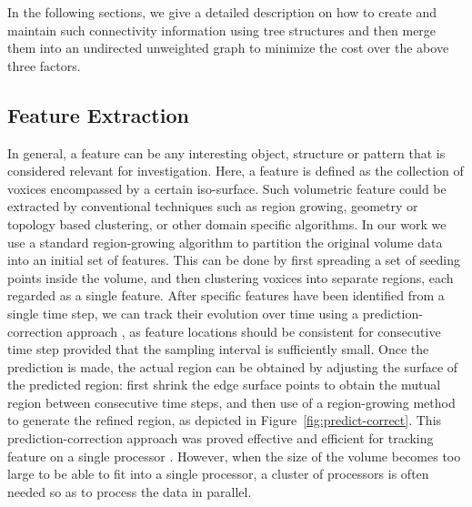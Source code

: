 \documentclass[10pt, conference, compsocconf]{IEEEtran}
\begin{document}
In the following sections, we give a detailed description on how to create and maintain such connectivity information using tree structures and then merge them into an undirected unweighted graph to minimize the cost over the above three factors.

\subsection{Feature Extraction}

In general, a feature can be any interesting object, structure or pattern that is considered relevant for investigation. Here, a feature is defined as the collection of voxices encompassed by a certain iso-surface. Such volumetric feature could be extracted by conventional techniques such as region growing, geometry or topology based clustering, or other domain specific algorithms. In our work we use a standard region-growing algorithm 
\cite{Huang2003} to partition the original volume data into an initial set of features. This can be done by first spreading a set of seeding points inside the volume, and then clustering voxices into separate regions, each regarded as a single feature. After specific features have been identified from a single time step, we can track their evolution over time using a prediction-correction approach \cite{Muelder2009}, as feature locations should be consistent for consecutive time step provided that the sampling interval is sufficiently small. Once the prediction is made, the actual region can be obtained by adjusting the surface of the predicted region: first shrink the edge surface points to obtain the mutual region between consecutive time steps, and then use of a region-growing method to generate the refined region, as depicted in Figure~\ref{fig:predict-correct}. This prediction-correction approach was proved effective and efficient for tracking feature on a single processor \cite{Muelder2009}. However, when the size of the volume becomes too large to be able to fit into a single processor, a cluster of processors is often needed so as to process the data in parallel. 
\end{document}
